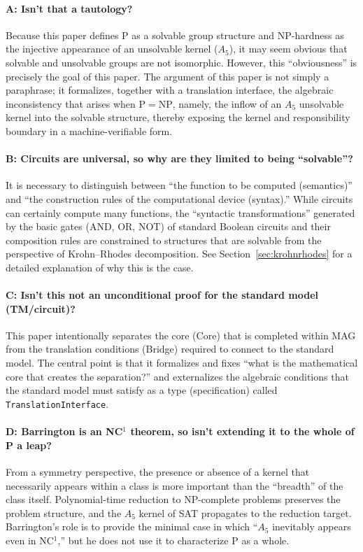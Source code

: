 \documentclass[11pt,a4paper]{article}
\theoremstyle{plain}
\theoremstyle{definition}
\newcommand{\Aalt}{A_5}
\newcommand{\TranslationInterface}{\texttt{TranslationInterface}}
\begin{document}
\paragraph{A: Isn't that a tautology?}
Because this paper defines P as a solvable group structure and NP-hardness as the injective appearance of an unsolvable kernel ($\Aalt$), it may seem obvious that solvable and unsolvable groups are not isomorphic. However, this ``obviousness'' is precisely the goal of this paper. The argument of this paper is not simply a paraphrase; it formalizes, together with a translation interface, the algebraic inconsistency that arises when $\mathrm{P} = \mathrm{NP}$, namely, the inflow of an $\Aalt$ unsolvable kernel into the solvable structure, thereby exposing the kernel and responsibility boundary in a machine-verifiable form.

\paragraph{B: Circuits are universal, so why are they limited to being ``solvable''?}
It is necessary to distinguish between ``the function to be computed (semantics)'' and ``the construction rules of the computational device (syntax).'' While circuits can certainly compute many functions, the ``syntactic transformations'' generated by the basic gates (AND, OR, NOT) of standard Boolean circuits and their composition rules are constrained to structures that are solvable from the perspective of Krohn--Rhodes decomposition. See Section~\ref{sec:krohnrhodes} for a detailed explanation of why this is the case.

\paragraph{C: Isn't this not an unconditional proof for the standard model (TM/circuit)?}
This paper intentionally separates the core (Core) that is completed within MAG from the translation conditions (Bridge) required to connect to the standard model. The central point is that it formalizes and fixes ``what is the mathematical core that creates the separation?'' and externalizes the algebraic conditions that the standard model must satisfy as a type (specification) called \TranslationInterface{}.

\paragraph{D: Barrington is an NC$^1$ theorem, so isn't extending it to the whole of P a leap?}
From a symmetry perspective, the presence or absence of a kernel that necessarily appears within a class is more important than the ``breadth'' of the class itself. Polynomial-time reduction to NP-complete problems preserves the problem structure, and the $\Aalt$ kernel of SAT propagates to the reduction target. Barrington's role is to provide the minimal case in which ``$\Aalt$ inevitably appears even in NC$^1$,'' but he does not use it to characterize P as a whole.
\end{document}
